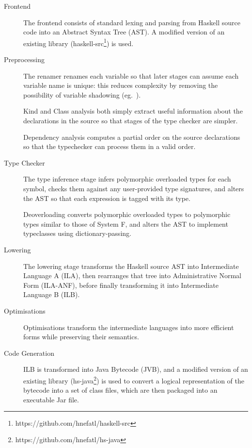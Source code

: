 \documentclass[dissertation.tex]{subfiles}
\begin{document}
\begin{description}
\item[Frontend]
{
    \hfill

    The frontend consists of standard lexing and parsing from Haskell source code into an Abstract Syntax Tree
    (AST). A modified version of an existing library (haskell-src\footnote{https://github.com/hnefatl/haskell-src})
    is used.

}
\item[Preprocessing]
{
    \hfill

    The renamer renames each variable so that later stages can assume each variable name is unique: this reduces
    complexity by removing the possibility of variable shadowing (eg.\ ).

    Kind and Class analysis both simply extract useful information about the declarations in the source so that stages
    of the type checker are simpler.

    Dependency analysis computes a partial order on the source declarations so that the typechecker can process them in
    a valid order.

}
\item[Type Checker]
{
    \hfill

    The type inference stage infers polymorphic overloaded types for each symbol, checks them against any user-provided
    type signatures, and alters the AST so that each expression is tagged with its type.

    Deoverloading converts polymorphic overloaded types to polymorphic types similar to those of System F, and alters
    the AST to implement typeclasses using dictionary-passing.

}
\item[Lowering]
{
    \hfill

    The lowering stage transforms the Haskell source AST into Intermediate Language A (ILA), then rearranges that tree
    into Administrative Normal Form (ILA-ANF), before finally transforming it into Intermediate Language B (ILB).

}
\item[Optimisations]
{
    \hfill

    Optimisations transform the intermediate languages into more efficient forms while preserving their semantics.

}
\item[Code Generation]
{
    \hfill

    ILB is transformed into Java Bytecode (JVB), and a modified version of an existing library
    (hs-java\footnote{https://github.com/hnefatl/hs-java}) is used to convert a logical representation of the bytecode
    into a set of class files, which are then packaged into an executable Jar file.

}
\end{description}
\end{document}
